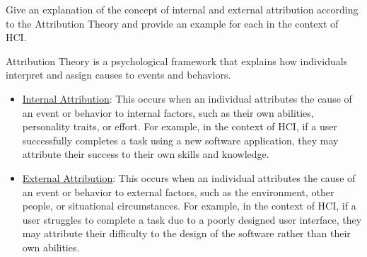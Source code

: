 \begin{ejercicio}
    Give an explanation of the concept of internal and external attribution according to the Attribution Theory and provide an example for each in the context of HCI.

    Attribution Theory is a psychological framework that explains how individuals interpret and assign causes to events and behaviors.
    \begin{itemize}
        \item \ul{Internal Attribution}: This occurs when an individual attributes the cause of an event or behavior to internal factors, such as their own abilities, personality traits, or effort. For example, in the context of HCI, if a user successfully completes a task using a new software application, they may attribute their success to their own skills and knowledge.
        \item \ul{External Attribution}: This occurs when an individual attributes the cause of an event or behavior to external factors, such as the environment, other people, or situational circumstances. For example, in the context of HCI, if a user struggles to complete a task due to a poorly designed user interface, they may attribute their difficulty to the design of the software rather than their own abilities.
    \end{itemize}
\end{ejercicio}

